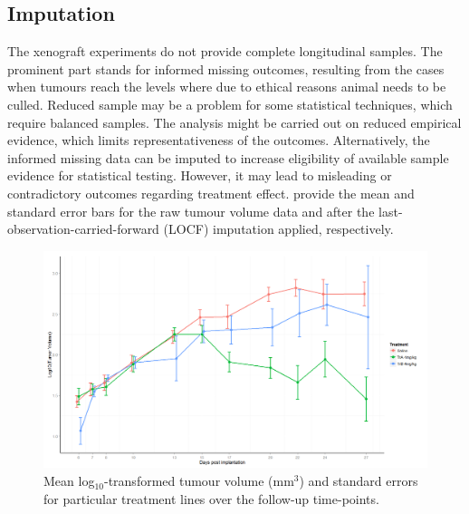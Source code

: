 \subsection{Imputation}
The xenograft experiments do not provide complete longitudinal samples.
The prominent part stands for informed missing outcomes, resulting from the cases when tumours reach the levels where due to ethical reasons animal needs to be culled.
Reduced sample may be a problem for some statistical techniques, which require balanced samples.
The analysis might be carried out on reduced empirical evidence, which limits representativeness of the outcomes.
Alternatively, the informed missing data can be imputed to increase eligibility of available sample evidence for statistical testing.
However, it may lead to misleading or contradictory outcomes regarding treatment effect.
 provide the mean and standard error bars for the raw tumour volume data and after the last-observation-carried-forward (LOCF) imputation applied, respectively.

\begin{figure}
	\centering
	\includegraphics[width=\textwidth]{xenograph/figures/error_bars_log_reduced_follow-up.png}
	\caption{Mean log$_{10}$-transformed tumour volume (mm$^3$) and standard errors for particular treatment lines over the follow-up time-points.}
	\label{error_bars_log_reduced_follow-up}
\end{figure}

